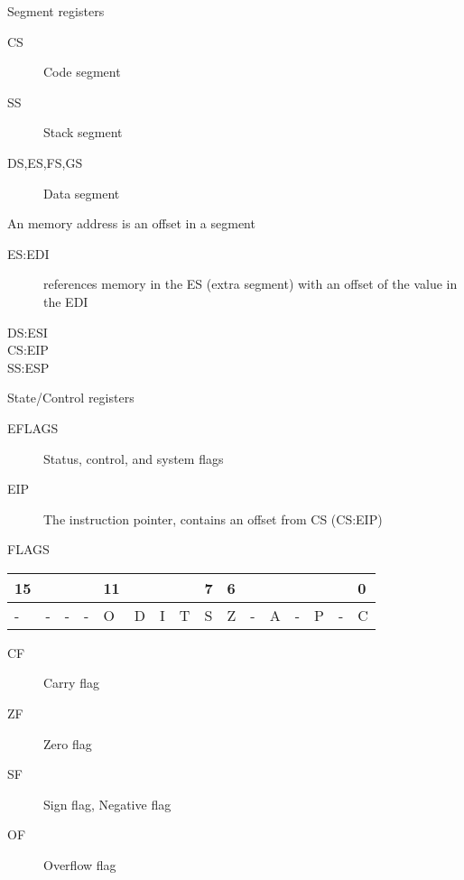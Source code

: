 \begin{frame}
  \begin{block}{Segment registers}
    \begin{description}
    \item[CS] Code segment
    \item[SS] Stack segment
    \item[DS,ES,FS,GS] Data segment
    \end{description}
  \end{block}
  \begin{block}{An memory address is an offset in a segment}
    \begin{description}
    \item[ES:EDI] references memory in the ES (extra segment) with an offset of the value in the EDI
    \item[DS:ESI]
    \item[CS:EIP]
    \item[SS:ESP] 
    \end{description}
  \end{block}
\end{frame}

\begin{frame}
  \begin{block}{State/Control registers}
    \begin{description}
    \item[EFLAGS] Status, control, and system flags
    \item[EIP] The instruction pointer, contains an offset from CS (CS:EIP)
    \end{description}
  \end{block}
  \begin{block}{FLAGS}
    \begin{tabular}{|l|l|l|l|l|l|l|l|l|l|l|l|l|l|l|l|}
      \hline
      15&&&&11&&&&7&6&&&&&&0\\\hline
      -&-&-&-&O&D&I&T&S&Z&-&A&-&P&-&C\\\hline
    \end{tabular}
    \begin{description}
    \item[CF] Carry flag
    \item[ZF] Zero flag
    \item[SF] Sign flag, Negative flag
    \item[OF] Overflow flag
    \end{description}
  \end{block}
\end{frame}

